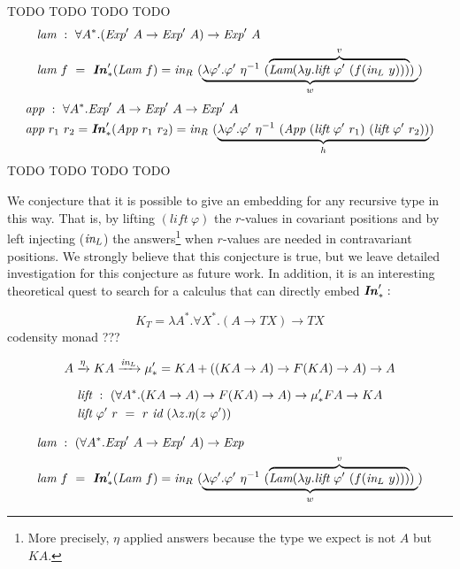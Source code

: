 TODO TODO TODO TODO
\begin{align*}
\textit{lam}&~:~\forall A^{*}.
		(\textit{Exp}'~A \to \textit{Exp}'~A) \to \textit{Exp}'~A \\
\textit{lam}&~f~=~\textbf{\textit{In}}_{*}'(\textit{Lam}~f)
= \textit{in}_{R}~(\underbrace{
	\lambda \varphi'.\varphi'~\eta^{-1}~
	(\overbrace{\textit{Lam}(\lambda y.\textit{lift}~\varphi'~(f(\textit{in}_{L}~y))) }^v)\;
	}_w)
\end{align*}
\begin{align*}
\textit{app}&~:~\forall A^{*}.
		\textit{Exp}'~A \to \textit{Exp}'~A \to \textit{Exp}'~A \\
\textit{app}&~r_1~r_2 = \textbf{\textit{In}}_{*}'(\textit{App}~r_1~r_2)
= \textit{in}_{R}~(\underbrace{
		\lambda \varphi'.\varphi'~\eta^{-1}~
		(\textit{App}~(\textit{lift}~\varphi'~r_1)~(\textit{lift}~\varphi'~r_2))}_h)
\end{align*}
TODO TODO TODO TODO

We conjecture that it is possible to give an embedding for any recursive type
in this way. That is, by lifting $(\textit{lift}~\varphi)$ the $r$-values
in covariant positions and by left injecting ($\textit{in}_{L}$) the answers\footnote{
	More precisely, $\eta$ applied answers
	because the type we expect is not $A$ but $K A$.}
when $r$-values are needed in contravariant positions.
We strongly believe that this conjecture is true, but we leave
detailed investigation for this conjecture as future work.
In addition, it is an interesting theoretical quest to search for
a calculus that can directly embed $\textbf{\textit{In}}_{*}' : $

\[K_T = \lambda A^{*}.\forall X^{*}.(A \to T X) \to T X \] codensity monad ???


\[ A \xrightarrow{\eta} KA \xrightarrow{\textit{in}_{L}} \mu_{*}' = KA+((KA \to A) \to F(KA) \to A) \to A \]


\begin{align*}
& \textit{lift}~:~(\forall A^{*}.(K A\to A)\to F(K A)\to A)\to \mu_{*}' F A\to K A\\
& \textit{lift}~\varphi'~r ~=~ r~\textit{id}~(\lambda z.\eta(z~\varphi'))
\end{align*}




\begin{align*}
\textit{lam}&~:~(\forall A^{*}.\textit{Exp}'~A \to \textit{Exp}'~A) \to
		\textit{Exp} \\
\textit{lam}&~f~=~\textbf{\textit{In}}_{*}'(\textit{Lam}~f)
= \textit{in}_{R}~(\underbrace{
	\lambda \varphi'.\varphi'~\eta^{-1}~
	(\overbrace{\textit{Lam}(\lambda y.\textit{lift}~\varphi'~(f(\textit{in}_{L}~y))) }^v)\;
	}_w)
\end{align*}

